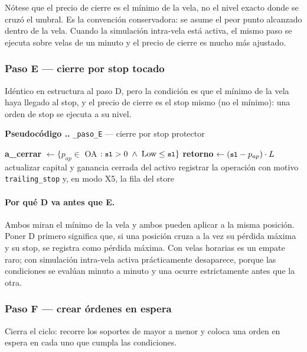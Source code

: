 \documentclass[11pt,a4paper]{article}
\newcommand{\code}[1]{\texttt{\small #1}}
\newcounter{pcode}[section]
\renewcommand{\thepcode}{\thesection.\arabic{pcode}}
\newenvironment{pseudo}[1]{%
  \par\medskip\noindent
  \refstepcounter{pcode}%
  \colorbox{cfondo}{\parbox{\dimexpr\linewidth-2\fboxsep\relax}{%
    \small\textbf{\textcolor{cazul}{Pseudocódigo \thepcode.}} #1}}%
  \par\nobreak\smallskip\begin{algorithmic}[1]%
}{\end{algorithmic}\par\medskip}
\newcommand{\bigsep}{\par\vspace{3pt}}
\begin{document}
\bigsep
Nótese que el precio de cierre es el mínimo de la vela, no el nivel exacto donde se cruzó el
umbral. Es la convención conservadora: se asume el peor punto alcanzado dentro de la vela.
Cuando la simulación intra-vela está activa, el mismo paso se ejecuta sobre velas de un
minuto y el precio de cierre es mucho más ajustado.

\subsubsection{Paso E — cierre por stop tocado}

Idéntico en estructura al paso D, pero la condición es que el mínimo de la vela haya llegado
al stop, y el precio de cierre es el stop mismo (no el mínimo): una orden de stop se ejecuta
a su nivel.

\begin{pseudo}{\code{_paso_E} — cierre por stop protector}
\State \textbf{a_cerrar} $\gets \{p_{ap} \in$ OA $: \code{sl} > 0 \;\wedge\; \text{Low} \le \code{sl}\}$
  \State \textbf{retorno} $\gets (\code{sl} - p_{ap}) \cdot L$ 
  \State actualizar capital y ganancia cerrada del activo
  \State registrar la operación con motivo \code{trailing_stop} y, en modo X5, la fila del store
\EndFor
\end{pseudo}

\paragraph{Por qué D va antes que E.} Ambos miran el mínimo de la vela y ambos pueden
aplicar a la misma posición. Poner D primero significa que, si una posición cruza a la vez
su pérdida máxima y su stop, se registra como pérdida máxima. Con velas horarias es un
empate raro; con simulación intra-vela activa prácticamente desaparece, porque las
condiciones se evalúan minuto a minuto y una ocurre estrictamente antes que la otra.

\subsubsection{Paso F — crear órdenes en espera}
\label{sec:x4-pasoF}

Cierra el ciclo: recorre los soportes de mayor a menor y coloca una orden en espera en cada
uno que cumpla las condiciones.
\end{document}
